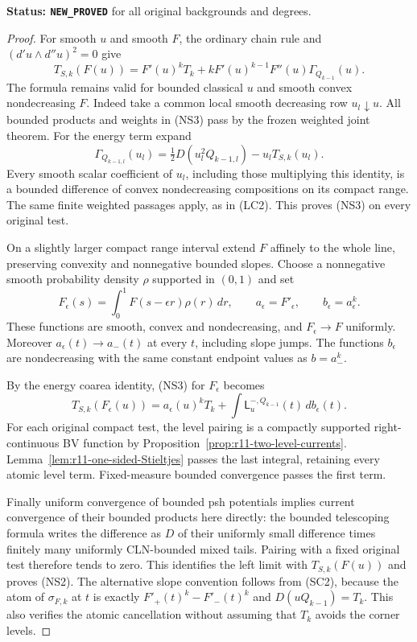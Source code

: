 \documentclass[11pt,a4paper]{article}
\numberwithin{equation}{section}
\theoremstyle{definition}
\theoremstyle{remark}
\begin{document}
\noindent\textbf{Status: \texttt{NEW\_PROVED}} for all original
backgrounds and degrees.

\begin{proof}
For smooth $u$ and smooth $F$, the ordinary chain rule and
$(d'u\wedge d''u)^2=0$ give
\[
 T_{S,k}(F(u))
   =F'(u)^kT_k+
       kF'(u)^{k-1}F''(u)\Gamma_{Q_{k-1}}(u).
 \tag{NS3}
\]
The formula remains valid for bounded classical $u$ and smooth
convex nondecreasing $F$. Indeed take a common local smooth
decreasing row $u_l\downarrow u$. All bounded products and
weights in (NS3) pass by the frozen weighted joint theorem.
For the energy term expand
\[
 \Gamma_{Q_{k-1,l}}(u_l)
       =\tfrac12D(u_l^2Q_{k-1,l})
                          -u_lT_{S,k}(u_l).
\]
Every smooth scalar coefficient of $u_l$, including those
multiplying this identity, is a bounded difference of convex
nondecreasing compositions on its compact range. The same
finite weighted passages apply, as in (LC2). This proves (NS3)
on every original test.

On a slightly larger compact range interval extend $F$ affinely
to the whole line, preserving convexity and nonnegative bounded
slopes. Choose a nonnegative smooth probability density
$\rho$ supported in $(0,1)$ and set
\[
 F_\epsilon(s)=\int_0^1F(s-\epsilon r)\rho(r)\,dr,\qquad
 a_\epsilon=F'_\epsilon,\qquad b_\epsilon=a_\epsilon^k.
\]
These functions are smooth, convex and nondecreasing, and
$F_\epsilon\to F$ uniformly. Moreover
$a_\epsilon(t)\to a_-(t)$ at every $t$, including slope jumps.
The functions $b_\epsilon$ are nondecreasing with the same
constant endpoint values as $b=a_-^k$.

By the energy coarea identity, (NS3) for $F_\epsilon$ becomes
\[
 T_{S,k}(F_\epsilon(u))
     =a_\epsilon(u)^k T_k+
          \int\mathsf L_u^{-,Q_{k-1}}(t)\,db_\epsilon(t).
\]
For each original compact test, the level pairing is a compactly
supported right-continuous BV function by
Proposition~\ref{prop:r11-two-level-currents}.
Lemma~\ref{lem:r11-one-sided-Stieltjes} passes the last integral,
retaining every atomic level term. Fixed-measure bounded
convergence passes the first term.

Finally uniform convergence of bounded psh potentials implies
current convergence of their bounded products here directly:
the bounded telescoping formula writes the difference as
$D$ of their uniformly small difference times finitely many
uniformly CLN-bounded mixed tails. Pairing with a fixed original
test therefore tends to zero. This identifies the left limit
with $T_{S,k}(F(u))$ and proves (NS2).
The alternative slope convention follows from (SC2), because
the atom of $\sigma_{F,k}$ at $t$ is exactly
$F'_+(t)^k-F'_-(t)^k$ and
$D(uQ_{k-1})=T_k$. This also verifies the atomic cancellation
without assuming that $T_k$ avoids the corner levels.
\end{proof}
\end{document}
